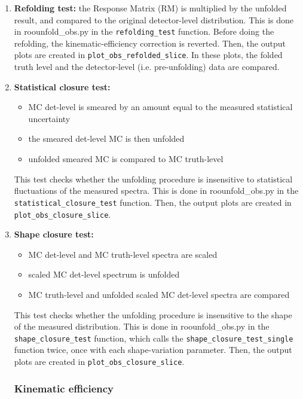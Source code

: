 \documentclass[12pt]{article}
\begin{document}
\begin{enumerate}
\item {\bf Refolding test:} the Response Matrix (RM) is multiplied by the unfolded result, and compared to the original detector-level distribution.
This is done in roounfold\_obs.py in the \verb|refolding_test| function. Before doing the refolding, the kinematic-efficiency correction is reverted.
Then, the output plots are created in \verb|plot_obs_refolded_slice|. In these plots, the folded truth level and the detector-level (i.e. pre-unfolding) data are compared.

\item {\bf Statistical closure test:}

\begin{itemize}
\item MC det-level is smeared by an amount equal to the measured statistical uncertainty
\item the smeared det-level MC is then unfolded
\item unfolded smeared MC is compared to MC truth-level
\end{itemize}

This test checks whether the unfolding procedure is insensitive to statistical fluctuations of the measured spectra.
This is done in roounfold\_obs.py in the \verb|statistical_closure_test| function.
Then, the output plots are created in \verb|plot_obs_closure_slice|.

\item {\bf Shape closure test:}

\begin{itemize}
\item MC det-level and MC truth-level spectra are scaled
\item scaled MC det-level spectrum is unfolded
\item MC truth-level and unfolded scaled MC det-level spectra are compared
\end{itemize}

This test checks whether the unfolding procedure is insensitive to the 
shape of the measured distribution.
This is done in roounfold\_obs.py in the \verb|shape_closure_test| function, which calls the
\verb|shape_closure_test_single| function twice, once with each shape-variation parameter.
Then, the output plots are created in \verb|plot_obs_closure_slice|.

\subsubsection{Kinematic efficiency}


\end{enumerate}
\end{document}
